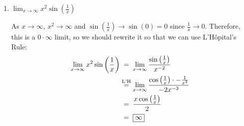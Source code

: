 \documentclass{article}
\begin{document}
\begin{enumerate}
\begin{enumerate}
      \item
        \begin{problem}
          $\displaystyle \lim_{x \to \infty} x^2 \sin \left(
            \frac{1}{x} \right)$
        \end{problem}

        \begin{solution}
          As $x \to \infty$, $x^2 \to \infty$ and $\sin \left(
            \frac{1}{x} \right) \to \sin(0) = 0$ since $\frac{1}{x} \to
          0$.  Therefore, this is a $0 \cdot \infty$ limit, so we should
          rewrite it so that we can use L'Hôpital's Rule:
          \begin{align*}
            \lim_{x \to \infty} x^2 \sin \left( \frac{1}{x} \right) &
            \nolheq \lim_{x \to \infty} \frac{\sin \left(
                \frac{1}{x} \right)}{x^{-2}} \\
            & \lheq \lim_{x \to \infty} \frac{\cos \left( \frac{1}{x}
              \right) \cdot - \frac{1}{x^2}}{- 2 x^{-3}} \\
            & \nolheq \frac{x \cos \left( \frac{1}{x} \right)}{2} \\
            & \nolheq \boxed{\infty}
          \end{align*}
        \end{solution}



      \end{enumerate}      
      \probonly{}
\fi
 






\end{enumerate}
\end{document}
